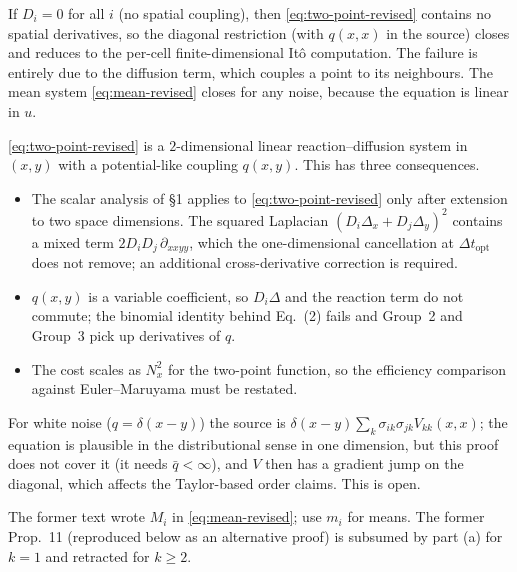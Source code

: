 \begin{remark}
If $D_i=0$ for all $i$ (no spatial coupling), then \eqref{eq:two-point-revised} contains no spatial derivatives, so the diagonal restriction (with $q(x,x)$ in the source) closes and reduces to the per-cell finite-dimensional It\^o computation. The failure is entirely due to the diffusion term, which couples a point to its neighbours. The mean system \eqref{eq:mean-revised} closes for any noise, because the equation is linear in $u$.
\end{remark}
 
\begin{remark}
\eqref{eq:two-point-revised} is a $2$-dimensional linear reaction--diffusion system in $(x,y)$ with a potential-like coupling $q(x,y)$. This has three consequences.
\begin{itemize}
\item The scalar analysis of \S1 applies to \eqref{eq:two-point-revised} only after extension to two space dimensions. The squared Laplacian $(D_i\Delta_x+D_j\Delta_y)^2$ contains a mixed term $2D_iD_j\,\partial_{xxyy}$, which the one-dimensional cancellation at $\Delta t_{\mathrm{opt}}$ does not remove; an additional cross-derivative correction is required.
\item $q(x,y)$ is a variable coefficient, so $D_i\Delta$ and the reaction term do not commute; the binomial identity behind Eq.~(2) fails and Group~2 and Group~3 pick up derivatives of $q$.
\item The cost scales as $N_x^2$ for the two-point function, so the efficiency comparison against Euler--Maruyama must be restated.
\end{itemize}
For white noise ($q=\delta(x-y)$) the source is $\delta(x-y)\sum_k\sigma_{ik}\sigma_{jk}V_{kk}(x,x)$; the equation is plausible in the distributional sense in one dimension, but this proof does not cover it (it needs $\bar q<\infty$), and $V$ then has a gradient jump on the diagonal, which affects the Taylor-based order claims. This is open.
\end{remark}
 
\begin{remark}[Notation]
The former text wrote $M_i$ in \eqref{eq:mean-revised}; use $m_i$ for means. The former Prop.~11 (reproduced below as an alternative proof) is subsumed by part (a) for $k=1$ and retracted for $k\ge 2$.
\end{remark}

